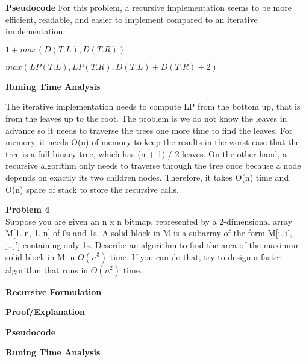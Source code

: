 \documentclass[12pt,article]{article}
\newenvironment{problem}[2][Problem]
    { \begin{mdframed}[backgroundcolor=gray!20] \textbf{#1 #2} \\}
    {  \end{mdframed}}
\begin{document}
\newpage
\textbf{Pseudocode}
For this problem, a recursive implementation seems to be more efficient, readable, and easier to implement compared to an iterative implementation.

\begin{algorithm}
\caption{$D(T)$}\label{alg:D}
\begin{algorithmic}
    \EndIf

    \EndIf

    \Return $1 + max(D(T.L), D(T.R))$
\end{algorithmic}
\end{algorithm}

\begin{algorithm}
\caption{$LP(T)$}\label{alg:LP}
\begin{algorithmic}
    \EndIf

    \EndIf

    \Return $max(LP(T.L), LP(T.R), D(T.L) + D(T.R) + 2)$
\end{algorithmic}
\end{algorithm}

\textbf{Runing Time Analysis}

The iterative implementation needs to compute LP from the bottom up, that is from the leaves up to the root. The problem is we do not know the leaves in advance so it needs to traverse the trees one more time to find the leaves. For memory, it needs O(n) of memory to keep the results in the worst case that the tree is a full binary tree, which has (n + 1) / 2 leaves. On the other hand, a recursive algorithm only needs to traverse through the tree once because a node depends on exactly its two children nodes. Therefore, it takes O(n) time and O(n) space of stack to store the recursive calls.

\newpage
\begin{problem}{4} 
Suppose you are given an n x n bitmap, represented by a 2-dimensional array M[1..n, 1..n] of 0s and 1s. A solid block in M is a subarray of the form M[i..i', j..j'] containing only 1s. Describe an algorithm to find the area of the maximum solid block in M in $O(n^3)$ time. If you can do that, try to design a faster algorithm that runs in $O(n^2)$ time.
\end{problem}

\textbf{Recursive Formulation}

\textbf{Proof/Explanation}

\textbf{Pseudocode}

\textbf{Runing Time Analysis}



\end{document}
